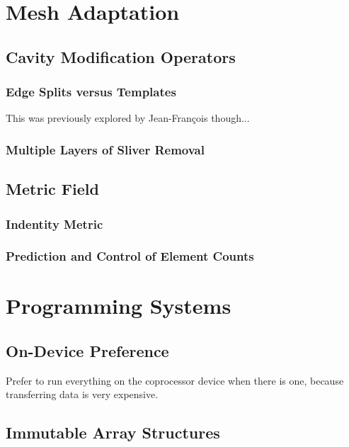 \section{Mesh Adaptation}

\subsection{Cavity Modification Operators}

\subsubsection{Edge Splits versus Templates}

This was previously explored by Jean-Fran\c{c}ois though...

\subsubsection{Multiple Layers of Sliver Removal}

\subsection{Metric Field}

\subsubsection{Indentity Metric}

\subsubsection{Prediction and Control of Element Counts}

\section{Programming Systems}

\subsection{On-Device Preference}

Prefer to run everything on the coprocessor device
when there is one, because transferring data
is very expensive.

\subsection{Immutable Array Structures}

